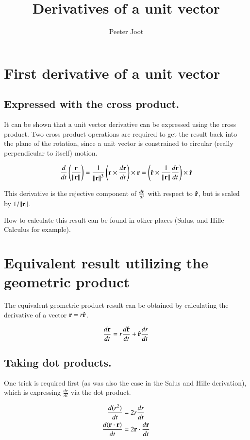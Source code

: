 \documentclass{article}      %
\title{Derivatives of a unit vector}
\author{Peeter Joot}         %
\newcommand{\dt}[1]{\frac{d {#1}}{dt}}
\begin{document}

\maketitle{}

\section{First derivative of a unit vector}

\subsection{Expressed with the cross product.}

It can be shown that a unit vector derivative can be expressed using the cross product.  Two cross product operations are required to get the result back into the plane of the rotation, since a unit vector is constrained to circular (really perpendicular to itself) motion.

\[
\dt{}\left(\frac{\Br}{\Vert \Br \Vert}\right)
= \frac{1}{{\Vert \Br \Vert}^3}\left(\Br \times \dt{\Br}\right) \times \Br
= \left(\rcap \times \frac{1}{{\Vert \Br \Vert}} \dt{\Br}\right) \times \rcap
\]

This derivative is the rejective component of $\dt{\Br}$ with respect to $\hat{\mathbf{r}}$, but is scaled by $1/\Vert \mathbf{r} \Vert$.

How to calculate this result can be found in other places (Salus, and Hille Calculus for example).

\section{Equivalent result utilizing the geometric product}

The equivalent geometric product result can be obtained by calculating the derivative of a vector $\mathbf{r} = r \hat{\mathbf{r}}$.

\[
\dt{\Br} = r \dt{\rcap} + \rcap \dt{r} 
\]

\subsection{Taking dot products.}
One trick is required first (as was also the case in the Salus and Hille derivation), which is expressing $\dt{r}$ via the dot product.

\begin{align*}
\dt{(r^2)} &= 2r \dt{r} \\
\dt{(\Br \cdot \Br)} &= 2 \Br \cdot \dt{\Br} \\
\end{align*}
\end{document}
